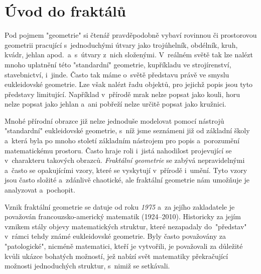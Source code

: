 \chapter{Úvod do fraktálů}\label{chapter:uvod_do_fraktalu}

Pod pojmem "geometrie" si čtenář pravděpodobně vybaví rovinnou či prostorovou geometrii pracující s~jednoduchými útvary jako trojúhelník, obdélník, kruh, kvádr, jehlan apod.~a~s~útvary z~nich složenými. V~reálném světě tak lze nalézt mnoho uplatnění této "standardní" geometrie, kupříkladu ve strojírenství, stavebnictví, i~jinde. Často tak máme o~světě představu právě ve smyslu eukleidovské geometrie. Lze však nalézt řadu objektů, pro jejichž popis jsou tyto představy limitující. Například v~přírodě mrak nelze popsat jako kouli, horu nelze popsat jako jehlan a~ani pobřeží nelze určitě popsat jako kružnici.\par

Mnohé přírodní obrazce již nelze jednoduše modelovat pomocí nástrojů "standardní" eukleidovské geometrie, s~níž jsme seznámeni již od základní školy a~která byla po mnoho století základním nástrojem pro popis a~porozumění matematickému prostoru. Často hraje roli i~jistá nahodilost projevující se v~charakteru takových obrazců. \emph{Fraktální geometrie} se zabývá nepravidelnými a~často se opakujícími vzory, které se vyskytují v~přírodě i~umění. Tyto vzory jsou často složité a~zdánlivě chaotické, ale fraktální geometrie nám umožňuje je analyzovat a~pochopit.\par

Vznik fraktální geometrie se datuje od roku \emph{1975} a~za jejího zakladatele je považován francouzsko-americký matematik  \mbox{(1924--2010)}. Historicky za jejím vznikem stály objevy matematických struktur, které nezapadaly do~"představ" v~rámci tehdy známé eukleidovské geometrie. Byly často považovány za "patologické", nicméně matematici, kteří je vytvořili, je považovali za důležité kvůli ukázce bohatých možností, jež nabízí svět matematiky překračující možnosti jednoduchých struktur, s~nimiž se setkávali. \citep[str. 33]{Mandelbrot1983}




